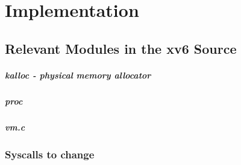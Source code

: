 \chapter{Implementation}

\label{chap:impl}





\section{Relevant Modules in the xv6 Source}
\paragraph*{kalloc - physical memory allocator}
\paragraph*{proc}
\paragraph*{vm.c}
\subsection*{Syscalls to change}
